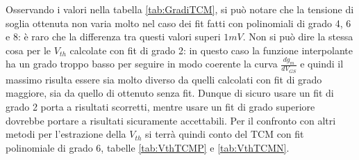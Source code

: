 \documentclass[12pt, letterpaper]{book}
\begin{document}
Osservando i valori nella tabella \ref{tab:GradiTCM}, si può notare che la tensione di soglia ottenuta non varia molto nel caso dei fit fatti con polinomiali di grado 4, 6 e 8: è raro che la differenza tra questi valori superi $1 mV$. Non si può dire la stessa cosa per le $V_{th}$ calcolate con fit di grado 2: in questo caso la funzione interpolante ha un grado troppo basso per seguire in modo coerente la curva $\frac{dg_m}{dV_{GS}}$ e quindi il massimo risulta essere sia molto diverso da quelli calcolati con fit di grado maggiore, sia da quello di ottenuto senza fit. Dunque di sicuro usare un fit di grado 2 porta a risultati scorretti, mentre usare un fit di grado superiore dovrebbe portare a risultati sicuramente accettabili. Per il confronto con altri metodi per l'estrazione della $V_{th}$ si terrà quindi conto del TCM con fit polinomiale di grado 6, tabelle \ref{tab:VthTCMP} e \ref{tab:VthTCMN}.
\end{document}
